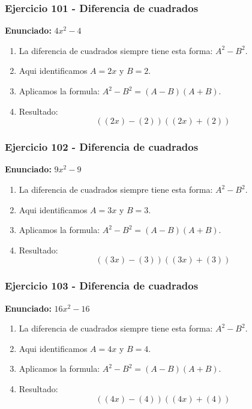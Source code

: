 \documentclass[11pt,a4paper]{article}
\begin{document}
\subsubsection*{Ejercicio 101 - Diferencia de cuadrados}
\textbf{Enunciado:} $ 4 x^{2} - 4 $\par
\begin{enumerate}[leftmargin=2em]
\item La diferencia de cuadrados siempre tiene esta forma: \(A^2-B^2\).
\item Aqui identificamos \(A=2 x\) y \(B=2\).
\item Aplicamos la formula: \(A^2-B^2=(A-B)(A+B)\).
\item Resultado: \[\boxed{\left(\left(2 x\right)-\left(2\right)\right)\left(\left(2 x\right)+\left(2\right)\right)}\]
\end{enumerate}

\vspace{0.2cm}
\subsubsection*{Ejercicio 102 - Diferencia de cuadrados}
\textbf{Enunciado:} $ 9 x^{2} - 9 $\par
\begin{enumerate}[leftmargin=2em]
\item La diferencia de cuadrados siempre tiene esta forma: \(A^2-B^2\).
\item Aqui identificamos \(A=3 x\) y \(B=3\).
\item Aplicamos la formula: \(A^2-B^2=(A-B)(A+B)\).
\item Resultado: \[\boxed{\left(\left(3 x\right)-\left(3\right)\right)\left(\left(3 x\right)+\left(3\right)\right)}\]
\end{enumerate}

\vspace{0.2cm}
\subsubsection*{Ejercicio 103 - Diferencia de cuadrados}
\textbf{Enunciado:} $ 16 x^{2} - 16 $\par
\begin{enumerate}[leftmargin=2em]
\item La diferencia de cuadrados siempre tiene esta forma: \(A^2-B^2\).
\item Aqui identificamos \(A=4 x\) y \(B=4\).
\item Aplicamos la formula: \(A^2-B^2=(A-B)(A+B)\).
\item Resultado: \[\boxed{\left(\left(4 x\right)-\left(4\right)\right)\left(\left(4 x\right)+\left(4\right)\right)}\]
\end{enumerate}
\end{document}

